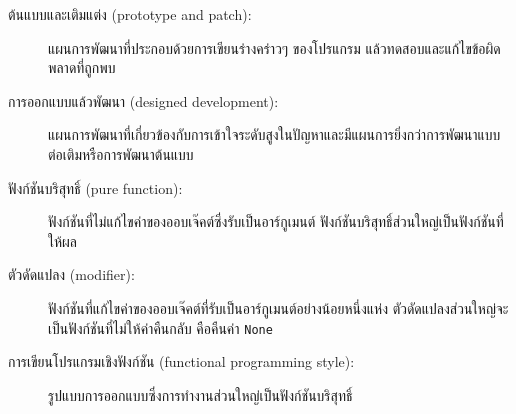 \begin{description}


\item[ต้นแบบและเติมแต่ง (prototype and patch):] แผนการพัฒนาที่ประกอบด้วยการเขียนร่างคร่าวๆ ของโปรแกรม แล้วทดสอบและแก้ไขข้อผิดพลาดที่ถูกพบ


\item[การออกแบบแล้วพัฒนา (designed development):] แผนการพัฒนาที่เกี่ยวข้องกับการเข้าใจระดับสูงในปัญหาและมีแผนการยิ่งกว่าการพัฒนาแบบต่อเติมหรือการพัฒนาต้นแบบ


\item[ฟังก์ชันบริสุทธิ์ (pure function):] ฟังก์ชันที่ไม่แก้ไขค่าของออบเจ๊คต์ซึ่งรับเป็นอาร์กูเมนต์ ฟังก์ชันบริสุทธิ์ส่วนใหญ่เป็นฟังก์ชันที่ให้ผล

  
\item[ตัวดัดแปลง (modifier):] ฟังก์ชันที่แก้ไขค่าของออบเจ๊คต์ที่รับเป็นอาร์กูเมนต์อย่างน้อยหนึ่งแห่ง 
ตัวดัดแปลงส่วนใหญ่จะเป็นฟังก์ชันที่ไม่ให้ค่าคืนกลับ คือคืนค่า {\tt None}


\item[การเขียนโปรแกรมเชิงฟังก์ชัน (functional programming style):] รูปแบบการออกแบบซึ่งการทำงานส่วนใหญ่เป็นฟังก์ชันบริสุทธิ์


\end{description}
